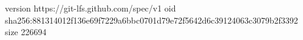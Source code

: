 version https://git-lfs.github.com/spec/v1
oid sha256:881314012f136e69f7229a6bbc0701d79e72f5642d6c39124063c3079b2f3392
size 226694
